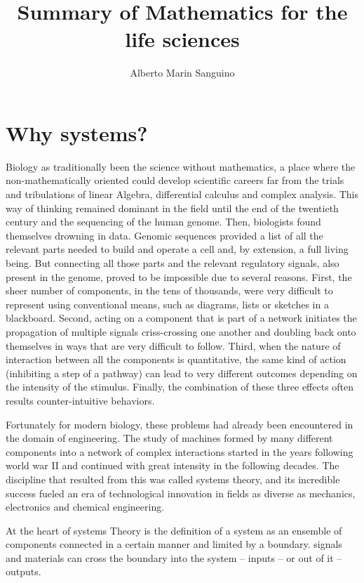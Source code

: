 \documentclass[12pt]{article}
\title{Summary of Mathematics for the life sciences}
\author{Alberto Marin Sanguino}
\begin{document}
\maketitle
\tableofcontents
\section{Why systems?}

Biology as traditionally been the science without mathematics, a place where the non-mathematically oriented  could develop  scientific careers far from the trials and tribulations of linear Algebra, differential calculus and complex analysis. This way of thinking remained dominant in the field until the end of the twentieth century and the sequencing of the human genome. Then, biologists found themselves drowning in data. Genomic sequences provided a list of all the relevant parts needed to build and operate a cell and, by extension, a full living being. But connecting all those parts and the relevant regulatory signals, also present in the genome, proved to be impossible due to several reasons. First, the sheer number of components, in the tens of thousands, were very difficult to represent using conventional means, such as diagrams, lists or sketches in a blackboard. Second, acting on a component that is part of a network initiates the propagation of multiple signals criss-crossing one another and doubling back onto themselves in ways that are very difficult to follow. Third, when the nature of interaction between all the components is quantitative, the same kind of action (inhibiting a step of a pathway) can lead to very different outcomes depending on the intensity of the stimulus. Finally, the combination of these three effects often results counter-intuitive behaviors.

Fortunately for modern biology, these problems had already been encountered in the domain of engineering. The study of machines formed by many different components into a network of complex interactions started in the years following world war II and continued with great intensity in the following decades. The discipline that resulted from this was called systems theory, and its incredible success fueled an era of technological innovation in fields as diverse as mechanics, electronics and chemical engineering.

At the heart of systems Theory is the definition of a system as an ensemble of components connected in a certain manner and limited by a boundary. signals and materials can cross the boundary into the system -- inputs -- or out of it -- outputs.
\end{document}
